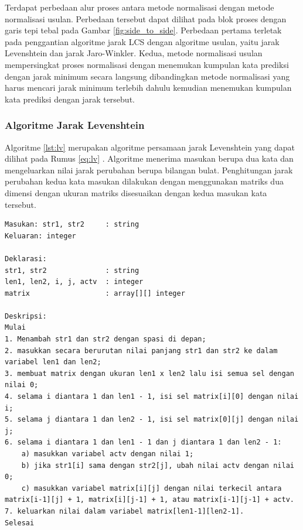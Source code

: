 Terdapat perbedaan alur proses antara metode normalisasi \parencite{saragih2017normalisasi} dengan metode normalisasi usulan. Perbedaan tersebut dapat dilihat pada blok proses dengan garis tepi tebal pada Gambar \ref{fig:side_to_side}. Perbedaan pertama terletak pada penggantian algoritme jarak LCS dengan algoritme usulan, yaitu jarak Levenshtein dan jarak Jaro-Winkler. Kedua, metode normalisasi usulan mempersingkat proses normalisasi dengan menemukan kumpulan kata prediksi dengan jarak minimum secara langsung dibandingkan metode normalisasi \parencite{saragih2017normalisasi} yang harus mencari jarak minimum terlebih dahulu kemudian menemukan kumpulan kata prediksi dengan jarak tersebut.

\subsubsection{Algoritme Jarak Levenshtein}

Algoritme \ref{lst:lv} merupakan algoritme persamaan jarak Levenshtein yang dapat dilihat pada Rumus \ref{eq:lv} \parencite{levenshtein1966binary}. Algoritme menerima masukan berupa dua kata dan mengeluarkan nilai jarak perubahan berupa bilangan bulat. Penghitungan jarak perubahan kedua kata masukan dilakukan dengan menggunakan matriks dua dimensi dengan ukuran matriks disesuaikan dengan kedua masukan kata tersebut.
\begin{lstlisting}[caption={Algoritme Fungsi Jarak Levenshtein},label={lst:lv},float,floatplacement=H]
Masukan: str1, str2		: string
Keluaran: integer

Deklarasi:
str1, str2 				: string
len1, len2, i, j, actv 	: integer
matrix					: array[][] integer

Deskripsi:
Mulai
1. Menambah str1 dan str2 dengan spasi di depan;
2. masukkan secara berurutan nilai panjang str1 dan str2 ke dalam variabel len1 dan len2;
3. membuat matrix dengan ukuran len1 x len2 lalu isi semua sel dengan nilai 0;
4. selama i diantara 1 dan len1 - 1, isi sel matrix[i][0] dengan nilai i;
5. selama j diantara 1 dan len2 - 1, isi sel matrix[0][j] dengan nilai j;
6. selama i diantara 1 dan len1 - 1 dan j diantara 1 dan len2 - 1:
	a) masukkan variabel actv dengan nilai 1;
	b) jika str1[i] sama dengan str2[j], ubah nilai actv dengan nilai 0;
	c) masukkan variabel matrix[i][j] dengan nilai terkecil antara matrix[i-1][j] + 1, matrix[i][j-1] + 1, atau matrix[i-1][j-1] + actv.
7. keluarkan nilai dalam variabel matrix[len1-1][len2-1].
Selesai
\end{lstlisting}

